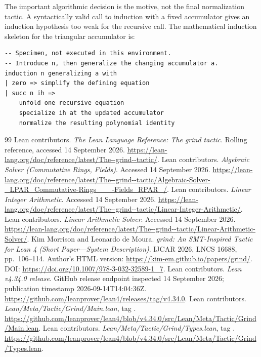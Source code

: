 \documentclass[11pt,letterpaper]{article}
\newcommand{\code}[1]{\texttt{\detokenize{#1}}}
\theoremstyle{definition}\newtheorem{definition}[proposition]{Definition}
\begin{document}
The important algorithmic decision is the motive, not the final normalization tactic. A syntactically valid call to induction with a fixed accumulator gives an induction hypothesis too weak for the recursive call. The mathematical induction skeleton for the triangular accumulator is:
\begin{lstlisting}
-- Specimen, not executed in this environment.
-- Introduce n, then generalize the changing accumulator a.
induction n generalizing a with
| zero => simplify the defining equation
| succ n ih =>
    unfold one recursive equation
    specialize ih at the updated accumulator
    normalize the resulting polynomial identity
\end{lstlisting}

\clearpage
\begin{thebibliography}{99}
\small
{} Lean contributors. \emph{The Lean Language Reference: The grind tactic}. Rolling reference, accessed 14 September 2026. \url{https://lean-lang.org/doc/reference/latest/The--grind--tactic/}.
 Lean contributors. \emph{Algebraic Solver (Commutative Rings, Fields)}. Accessed 14 September 2026. \url{https://lean-lang.org/doc/reference/latest/The--grind--tactic/Algebraic-Solver-_LPAR_Commutative-Rings___-Fields_RPAR_/}.
 Lean contributors. \emph{Linear Integer Arithmetic}. Accessed 14 September 2026. \url{https://lean-lang.org/doc/reference/latest/The--grind--tactic/Linear-Integer-Arithmetic/}.
 Lean contributors. \emph{Linear Arithmetic Solver}. Accessed 14 September 2026. \url{https://lean-lang.org/doc/reference/latest/The--grind--tactic/Linear-Arithmetic-Solver/}.
 Kim Morrison and Leonardo de Moura. \emph{grind: An SMT-Inspired Tactic for Lean 4 (Short Paper---System Description)}. IJCAR 2026, LNCS 16688, pp.~106--114. Author's HTML version: \url{https://kim-em.github.io/papers/grind/}. DOI: \url{https://doi.org/10.1007/978-3-032-32589-1_7}.
 Lean contributors. \emph{Lean v4.34.0 release}. GitHub release endpoint inspected 14 September 2026; publication timestamp 2026-09-14T14:04:36Z. \url{https://github.com/leanprover/lean4/releases/tag/v4.34.0}.
 Lean contributors. \emph{Lean/Meta/Tactic/Grind/Main.lean}, tag \code{v4.34.0}. \url{https://github.com/leanprover/lean4/blob/v4.34.0/src/Lean/Meta/Tactic/Grind/Main.lean}.
 Lean contributors. \emph{Lean/Meta/Tactic/Grind/Types.lean}, tag \code{v4.34.0}. \url{https://github.com/leanprover/lean4/blob/v4.34.0/src/Lean/Meta/Tactic/Grind/Types.lean}.

\end{thebibliography}
\end{document}

